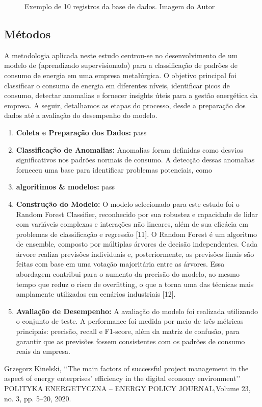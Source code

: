 \documentclass[conference]{IEEEtran}
\begin{document}
\begin{figure}[ht]
    \centering
    \caption{Exemplo de 10 registros da base de dados. Imagem do Autor}
    \label{fig:enter-label3}
\end{figure}

\subsection{Métodos}

A metodologia aplicada neste estudo centrou-se no desenvolvimento de um modelo de (aprendizado supervisionado) para a classificação de padrões de consumo de energia em uma empresa metalúrgica. O objetivo principal foi classificar o consumo de energia em diferentes níveis, identificar picos de consumo, detectar anomalias e fornecer insights úteis para a gestão energética da empresa. A seguir, detalhamos as etapas do processo, desde a preparação dos dados até a avaliação do desempenho do modelo. 


\begin{enumerate}
    \item \textbf{Coleta e Preparação dos Dados:} 
    pass
    
    \item \textbf{Classificação de Anomalias:} Anomalias foram definidas como desvios significativos nos padrões normais de consumo. A detecção dessas anomalias forneceu uma base para identificar problemas potenciais, como  

    \item \textbf{algoritimos \& modelos: }
    pass
        
    \item \textbf{Construção do Modelo:} O modelo selecionado para este estudo foi o Random Forest Classifier, reconhecido por sua robustez e capacidade de lidar com variáveis complexas e interações não lineares, além de sua eficácia em problemas de classificação e regressão [11]. O Random Forest é um algoritmo de ensemble, composto por múltiplas árvores de decisão independentes. Cada árvore realiza previsões individuais e, posteriormente, as previsões finais são feitas com base em uma votação majoritária entre as árvores. Essa abordagem contribui para o aumento da precisão do modelo, ao mesmo tempo que reduz o risco de overfitting, o que a torna uma das técnicas mais amplamente utilizadas em cenários industriais [12]. 
    
    \item \textbf{Avaliação de Desempenho:} A avaliação do modelo foi realizada utilizando o conjunto de teste. A performance foi medida por meio de três métricas principais: precisão, recall e F1-score, além da matriz de confusão, para garantir que as previsões fossem consistentes com os padrões de consumo reais da empresa.\\
    
\end{enumerate}

\begin{thebibliography}{00}

Grzegorz Kinelski, ‘‘The main factors of successful project management in the aspect of energy enterprises’ efficiency in the digital economy environment’’ POLITYKA ENERGETYCZNA – ENERGY POLICY JOURNAL,Volume 23, no. 3, pp. 5–20, 2020.
\end{thebibliography}
\end{document}
